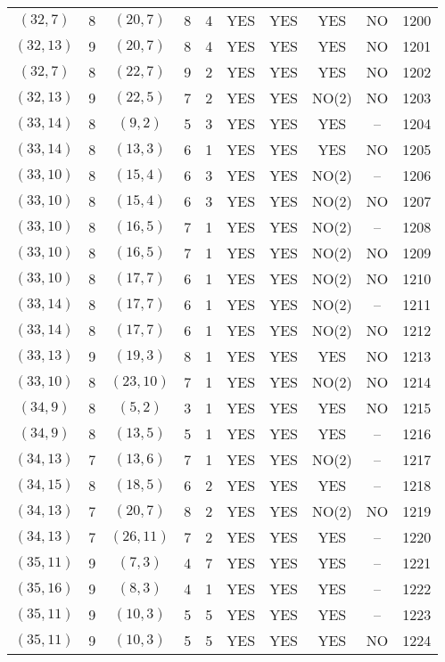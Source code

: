 \begin{longtable}{|c|c|c|c|c|c|c|c|c|c|}
$(32, 7)$ & 8 & $(20, 7)$ & 8 & 4 & YES & YES & YES & NO & 1200\\
$(32, 13)$ & 9 & $(20, 7)$ & 8 & 4 & YES & YES & YES & NO & 1201\\
$(32, 7)$ & 8 & $(22, 7)$ & 9 & 2 & YES & YES & YES & NO & 1202\\
$(32, 13)$ & 9 & $(22, 5)$ & 7 & 2 & YES & YES & NO(2) & NO & 1203\\
$(33, 14)$ & 8 & $(9, 2)$ & 5 & 3 & YES & YES & YES & -- & 1204\\
$(33, 14)$ & 8 & $(13, 3)$ & 6 & 1 & YES & YES & YES & NO & 1205\\
$(33, 10)$ & 8 & $(15, 4)$ & 6 & 3 & YES & YES & NO(2) & -- & 1206\\
$(33, 10)$ & 8 & $(15, 4)$ & 6 & 3 & YES & YES & NO(2) & NO & 1207\\
$(33, 10)$ & 8 & $(16, 5)$ & 7 & 1 & YES & YES & NO(2) & -- & 1208\\
$(33, 10)$ & 8 & $(16, 5)$ & 7 & 1 & YES & YES & NO(2) & NO & 1209\\
$(33, 10)$ & 8 & $(17, 7)$ & 6 & 1 & YES & YES & NO(2) & NO & 1210\\
$(33, 14)$ & 8 & $(17, 7)$ & 6 & 1 & YES & YES & NO(2) & -- & 1211\\
$(33, 14)$ & 8 & $(17, 7)$ & 6 & 1 & YES & YES & NO(2) & NO & 1212\\
$(33, 13)$ & 9 & $(19, 3)$ & 8 & 1 & YES & YES & YES & NO & 1213\\
$(33, 10)$ & 8 & $(23, 10)$ & 7 & 1 & YES & YES & NO(2) & NO & 1214\\
$(34, 9)$ & 8 & $(5, 2)$ & 3 & 1 & YES & YES & YES & NO & 1215\\
$(34, 9)$ & 8 & $(13, 5)$ & 5 & 1 & YES & YES & YES & -- & 1216\\
$(34, 13)$ & 7 & $(13, 6)$ & 7 & 1 & YES & YES & NO(2) & -- & 1217\\
$(34, 15)$ & 8 & $(18, 5)$ & 6 & 2 & YES & YES & YES & -- & 1218\\
$(34, 13)$ & 7 & $(20, 7)$ & 8 & 2 & YES & YES & NO(2) & NO & 1219\\
$(34, 13)$ & 7 & $(26, 11)$ & 7 & 2 & YES & YES & YES & -- & 1220\\
$(35, 11)$ & 9 & $(7, 3)$ & 4 & 7 & YES & YES & YES & -- & 1221\\
$(35, 16)$ & 9 & $(8, 3)$ & 4 & 1 & YES & YES & YES & -- & 1222\\
$(35, 11)$ & 9 & $(10, 3)$ & 5 & 5 & YES & YES & YES & -- & 1223\\
$(35, 11)$ & 9 & $(10, 3)$ & 5 & 5 & YES & YES & YES & NO & 1224\\

\end{longtable}
